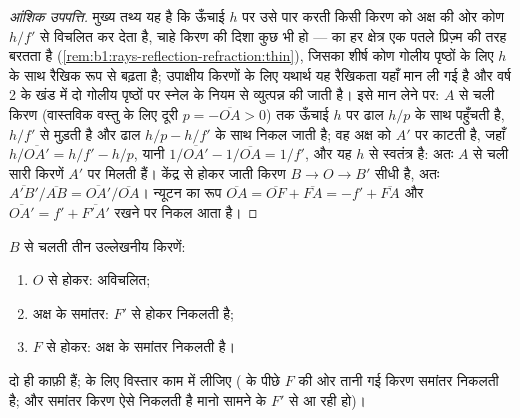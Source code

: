\begin{proof}[आंशिक उपपत्ति]
मुख्य तथ्य यह है कि  ऊँचाई $h$ पर उसे पार करती किसी किरण को अक्ष की
ओर कोण $h/f'$ से विचलित कर देता है, चाहे किरण की दिशा कुछ भी हो
---  का हर क्षेत्र एक पतले प्रिज़्म की तरह बरतता है
(\cref{rem:b1:rays-reflection-refraction:thin}), जिसका शीर्ष कोण गोलीय
पृष्ठों के लिए $h$ के साथ रैखिक रूप से बढ़ता है; उपाक्षीय किरणों के लिए यथार्थ
यह रैखिकता यहाँ मान ली गई है और वर्ष 2 के खंड में दो गोलीय पृष्ठों पर स्नेल के
नियम से व्युत्पन्न की जाती है। इसे मान लेने पर: $A$ से चली किरण (वास्तविक
वस्तु के लिए दूरी $p = -\overline{OA} > 0$)  तक ऊँचाई $h$ पर
ढाल $h/p$ के साथ पहुँचती है, $h/f'$ से मुड़ती है और ढाल $h/p - h/f'$ के साथ
निकल जाती है; वह अक्ष को $A'$ पर काटती है, जहाँ $h/\overline{OA'} = h/f' - h/p$, यानी $1/\overline{OA'}
- 1/\overline{OA} = 1/f'$, और यह $h$ से स्वतंत्र है: अतः $A$ से चली सारी
किरणें $A'$ पर मिलती हैं। केंद्र से होकर जाती किरण $B \to O \to B'$ सीधी है,
अतः $\overline{A'B'}/\overline{AB} = \overline{OA'}/\overline{OA}$। न्यूटन का
रूप $\overline{OA} = \overline{OF} + \overline{FA}
= -f' + \overline{FA}$ और $\overline{OA'} = f' + \overline{F'A'}$ रखने पर
निकल आता है।
\end{proof}

\begin{method}\label{met:b1:mirrors-thin-lenses:lensrays}
$B$ से चलती तीन उल्लेखनीय किरणें:
\begin{enumerate}
  \item $O$ से होकर: अविचलित;
  \item अक्ष के समांतर: $F'$ से होकर निकलती है;
  \item $F$ से होकर: अक्ष के समांतर निकलती है।
\end{enumerate}
दो ही काफ़ी हैं;  के लिए विस्तार काम में लीजिए ( के पीछे $F$ की
ओर तानी गई किरण समांतर निकलती है; और समांतर किरण ऐसे निकलती है मानो सामने के
$F'$ से आ रही हो)।
\end{method}

